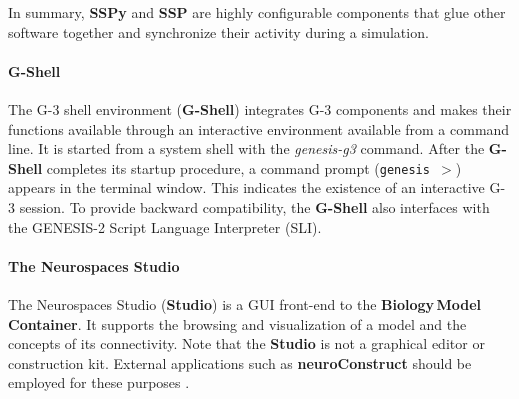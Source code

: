 \documentclass{article}
\begin{document}
In summary, {\bf SSPy} and {\bf SSP}  are highly configurable components that glue other software together and synchronize their activity during a simulation. 




\paragraph{G-Shell}

The G-3 shell environment ({\bf G-Shell}) integrates G-3 components and makes their
functions available through an interactive environment available from
a command line.  It is
started from a system shell with the {\it genesis-g3} command. After the {\bf G-Shell} completes its startup procedure, a
command prompt  ({\tt genesis\,$>$}) appears in the terminal window. This indicates the
existence of an interactive
G-3 session. To provide backward compatibility, the {\bf
  G-Shell} also interfaces with the GENESIS-2 Script Language Interpreter (SLI). 

\paragraph{The Neurospaces Studio}

The Neurospaces Studio ({\bf Studio}) is a GUI front-end to the {\bf Biology\,Model\,Container}. 
It supports the browsing and visualization of a model and the
concepts of its connectivity\cite{nordlie09:_visual}.  Note that the
{\bf Studio} is not a graphical editor or construction kit.  External
applications such as {\bf neuroConstruct} should be employed for these
purposes \cite{gleeson07}.
\end{document}
